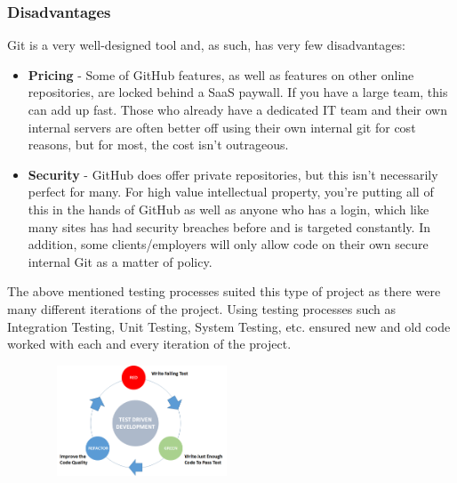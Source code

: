 \subsubsection{Disadvantages}
Git is a very well-designed tool and, as such, has very few disadvantages:

\begin{itemize}
    \item \textbf{Pricing} - Some of GitHub features, as well as features on 
    other online repositories, are locked behind a SaaS paywall. If you have a 
    large team, this can add up fast. Those who already have a dedicated IT team
    and their own internal servers are often better off using their own internal
    git for cost reasons, but for most, the cost isn’t outrageous.
    \item \textbf{Security} - GitHub does offer private repositories, but this
    isn’t necessarily perfect for many. For high value intellectual property, 
    you’re putting all of this in the hands of GitHub as well as anyone who has 
    a login, which like many sites has had security breaches before and is 
    targeted constantly. In addition, some clients/employers will only allow 
    code on their own secure internal Git as a matter of policy.
\end{itemize}

The above mentioned testing processes suited this type of project as there were
many different iterations of the project. Using testing processes such as 
Integration Testing, Unit Testing, System Testing, etc. ensured new and old code
worked with each and every iteration of the project.
\par
\medskip
\par
\medskip
\begin{center}
    \includegraphics[width=8cm,height=3.3cm,keepaspectratio]{images/tdd}
\end{center}
